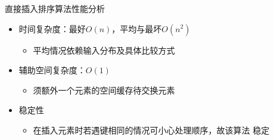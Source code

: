 \begin{frame}
    \frametitle{\insertsectionhead}
    \begin{block}{直接插入排序算法性能分析}
        \begin{itemize}
            \item 时间复杂度：最好$O(n)$，平均与最坏$O(n^{2})$
                  \begin{itemize}
                      \item 平均情况依赖输入分布及具体比较方式
                  \end{itemize}
            \item 辅助空间复杂度：$O(1)$
                  \begin{itemize}
                      \item 须额外一个元素的空间缓存待交换元素
                  \end{itemize}
            \item 稳定性
                  \begin{itemize}
                      \item 在插入元素时若遇键相同的情况可小心处理顺序，故该算法
                            \alert{稳定}
                  \end{itemize}
        \end{itemize}
    \end{block}
\end{frame}



